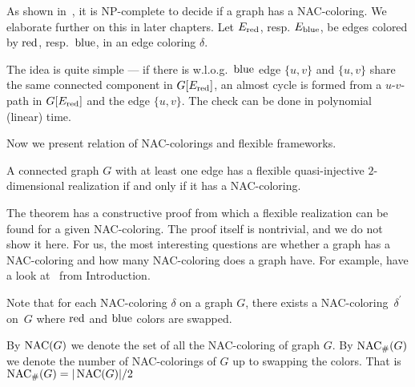 As shown in~\cite{np_complete}, it is NP-complete to decide if a graph has a NAC-coloring.
We elaborate further on this in later chapters.
Let \( E_{\text{red}}\), resp. \( E_{\text{blue}} \), be edges colored by \( \text{red} \), resp.~\( \text{blue} \),
in an edge coloring \( \delta \).
%
%
The idea is quite simple --- if there is w.l.o.g.\ \( \text{blue} \) edge \( \{u, v\} \)
and \( \{u, v\} \) share the same connected component in \( G[E_{\text{red}}] \),
an almost cycle is formed from a \( u \)-\( v \)-path in \( G[E_{\text{red}}] \)
and the edge \( \{u, v\} \).
The check can be done in polynomial (linear) time.

Now we present relation of NAC-colorings and flexible frameworks.
%
\begin{theorem}
	A connected graph \( G \) with at least one edge has a flexible
	quasi-injective \( 2 \)-dimensional realization if and only if it has a NAC-coloring.
\end{theorem}
%
The theorem has a constructive proof from which a flexible realization
can be found for a given NAC-coloring.
The proof itself is nontrivial, and we do not show it here.
For us, the most interesting questions are whether a graph has a NAC-coloring
and how many NAC-coloring does a graph have.
For example, have a look at~
from Introduction.

Note that for each NAC-coloring \( \delta \) on a graph \( G \),
there exists a NAC-coloring~\( \delta^\prime \) on~\( G \)
where \( \text{red} \) and \( \text{blue} \) colors are swapped.
%
\begin{definition}
	By \( \operatorname{NAC}(G) \) we denote the set of all the NAC-coloring of graph \( G \).
	By \( \operatorname{NAC}_{\#} (G) \) we denote the number of NAC-colorings of \( G \)
	up to swapping the colors.
	That is \( \operatorname{NAC}_{\#} (G) = | \operatorname{NAC}(G) | / 2 \)
\end{definition}
%

